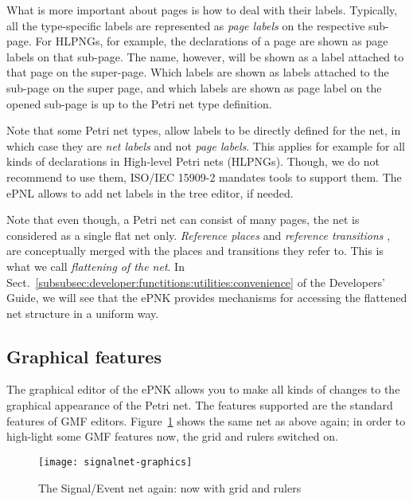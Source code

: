 What is more important about pages is how to deal with their labels. Typically,
all the type-specific labels are represented as \emph{page labels}%
on the respective sub-page.
For HLPNGs, for example, the declarations of a page
are shown as page labels on that sub-page. The name, however, will be shown as a label
attached to that page on the super-page.  Which labels are shown as
labels attached to the sub-page on the super page, and which labels are shown
as page label on the opened sub-page is up to the Petri net type definition.%

Note that some Petri net types, allow labels to be directly defined for the net,
in which case they are \emph{net labels}%
and not \emph{page labels}. This applies for example for all kinds
of declarations in High-level Petri nets (HLPNGs). Though, we do not recommend
to use them, ISO/IEC 15909-2 mandates tools to support them. The ePNL allows
to add net labels in the tree editor, if needed.

Note that even though, a Petri net can consist of many pages, the net is
considered as a single flat net only. \emph{Reference places}%
and
\emph{reference transitions}%
, are conceptually merged with the places and
transitions they refer to. This is what we call \emph{flattening of the net}.%
In Sect.~\ref{subsubsec:developer:functitions:utilities:convenience} of the
Developers' Guide, we will see that the ePNK provides mechanisms for
accessing the flattened net structure in a uniform way.%


\subsection{Graphical features}

The graphical editor of the ePNK allows you to make all kinds of changes to
the graphical appearance of the Petri net. The features supported are
the standard features of GMF editors. Figure~\ref{fig:signal-net-graphics}
shows the same net as above again; in order to high-light some GMF features
now, the grid and rulers switched on.

\begin{figure}[hbt!!]
  \centerline{\texttt{[image: signalnet-graphics]}}
  \caption{The Signal/Event net again: now with grid and rulers}
  \label{fig:signal-net-graphics}
\end{figure}

